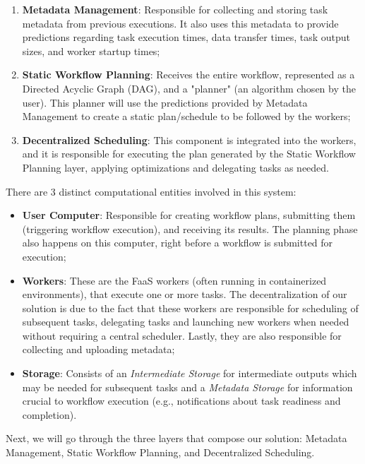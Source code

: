 \documentclass[conference]{IEEEtran}
\begin{document}
\begin{enumerate}
    \item \textbf{Metadata Management}: Responsible for collecting and storing task metadata from previous executions. It also uses this metadata to provide predictions regarding task execution times, data transfer times, task output sizes, and worker startup times;
    \item \textbf{Static Workflow Planning}: Receives the entire workflow, represented as a Directed Acyclic Graph (DAG), and a "planner" (an algorithm chosen by the user). This planner will use the predictions provided by Metadata Management to create a static plan/schedule to be followed by the workers;
    \item \textbf{Decentralized Scheduling}: This component is integrated into the workers, and it is responsible for executing the plan generated by the Static Workflow Planning layer, applying optimizations and delegating tasks as needed.
\end{enumerate}

There are 3 distinct computational entities involved in this system:

\begin{itemize}
    \item \textbf{User Computer}: Responsible for creating workflow plans, submitting them (triggering workflow execution), and receiving its results. The planning phase also happens on this computer, right before a workflow is submitted for execution;
    \item \textbf{Workers}: These are the FaaS workers (often running in containerized environments), that execute one or more tasks. The decentralization of our solution is due to the fact that these workers are responsible for scheduling of subsequent tasks, delegating tasks and launching new workers when needed without requiring a central scheduler. Lastly, they are also responsible for collecting and uploading metadata;
    \item \textbf{Storage}: Consists of an \textit{Intermediate Storage} for intermediate outputs which may be needed for subsequent tasks and a \textit{Metadata Storage} for information crucial to workflow execution (e.g., notifications about task readiness and completion).
\end{itemize}

Next, we will go through the three layers that compose our solution: Metadata Management, Static Workflow Planning, and Decentralized Scheduling.
\end{document}

